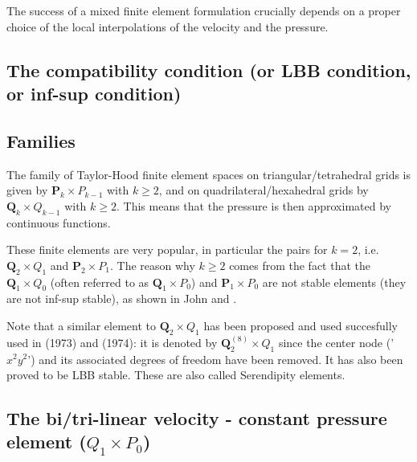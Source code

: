 

The success of a mixed finite element formulation crucially depends on a proper choice of the local interpolations of the velocity and the pressure. 

\subsection{The compatibility condition (or LBB condition, or inf-sup condition)} \label{ss:LBBcond}
 



\subsection{Families}

The family of {\color{olive} Taylor-Hood} finite element spaces on triangular/tetrahedral 
grids is given by ${\bm P}_k \times P_{k-1}$ with $k\geq 2$, 
and on quadrilateral/hexahedral grids by ${\bm Q}_k \times Q_{k-1}$ with $k\geq 2$.
This means that the pressure is then approximated by continuous functions. 

These finite elements are very popular, in particular the pairs for $k=2$, i.e.
${\bm Q}_2\times Q_1$ and ${\bm P}_2\times P_1$.
The reason why $k\geq 2$ comes from the fact that the 
${\bm Q}_1 \times Q_0$ (often referred to as ${\bm Q}_1 \times P_0$) and ${\bm P}_1\times P_0$
are not stable elements (they are not inf-sup stable), as
shown in John \cite[p64]{john16} and \cite[p67]{john16}. 

\begin{remark}
Note that a similar element to ${\bm Q}_2 \times Q_1$ has been proposed
and used succesfully used in \textcite{taho73} (1973) and \textcite{hota74} (1974): 
it is denoted by ${\bm Q}_2^{(8)} \times Q_1$ 
since the center node ('$x^2y^2$') and its associated degrees of freedom have been removed. It 
has also been proved to be LBB stable. These are also called {\color{olive} Serendipity} elements. 
\end{remark}

\subsection{The bi/tri-linear velocity - constant pressure element ($Q_1\times P_0$)}
\label{ss:pairq1p0}


